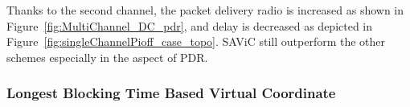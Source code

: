 Thanks to the second channel, the packet delivery radio is increased as shown in Figure~\ref{fig:MultiChannel_DC_pdr}, and delay is decreased as depicted in Figure~\ref{fig:singleChannelPioff_case_topo}.
SAViC still outperform the other schemes especially in the aspect of PDR.






\subsubsection{Longest Blocking Time Based Virtual Coordinate}    \mbox{}
\label{subsection:blocking_time}



